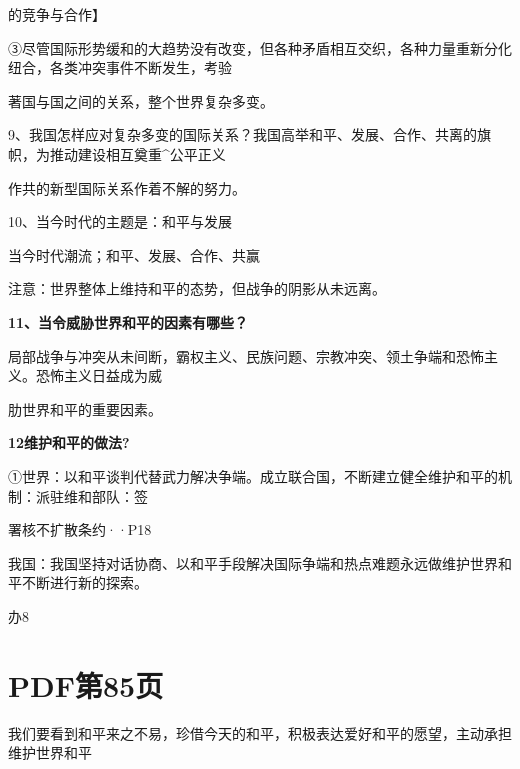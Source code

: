 \documentclass[lang=cn,11pt]{elegantbook}
\newcommand{\daofasym}[1]{{\daofasymbolfont #1}}
\newcommand{\daofasym}[1]{#1}
\begin{document}
的竞争与合作】\par

\daofasym{③}尽管国际形势缓和的大趋势没有改变，但各种矛盾相互交织，各种力量重新分化纽合，各类冲突事件不断发生，考验\par

著国与国之间的关系，整个世界复杂多变。\par

9、我国怎样应对复杂多变的国际关系？我国高举和平、发展、合作、共离的旗帜，为推动建设相互奠重\textasciicircum{}公平正义\par

作共的新型国际关系作着不解的努力。\par

10、当今时代的主题是：和平与发展\par

当今时代潮流；和平、发展、合作、共赢\par

注意：世界整体上维持和平的态势，但战争的阴影从未远离。\par

\textbf{11、当令威胁世界和平的因素有哪些？}\par

局部战争与冲突从未间断，霸权主义、民族问题、宗教冲突、领土争端和恐怖主义。恐怖主义日益成为威\par

肋世界和平的重要因素。\par

\textbf{12维护和平的做法?}\par

\daofasym{①}世界：以和平谈判代替武力解决争端。成立联合国，不断建立健全维护和平的机制：派驻维和部队：签\par

署核不扩散条约··P18\par

我国：我国坚持对话协商、以和平手段解决国际争端和热点难题永远做维护世界和平不断进行新的探索。\par

办8\par


\section*{PDF第85页}

我们要看到和平来之不易，珍借今天的和平，积极表达爱好和平的愿望，主动承担维护世界和平\par
\end{document}
